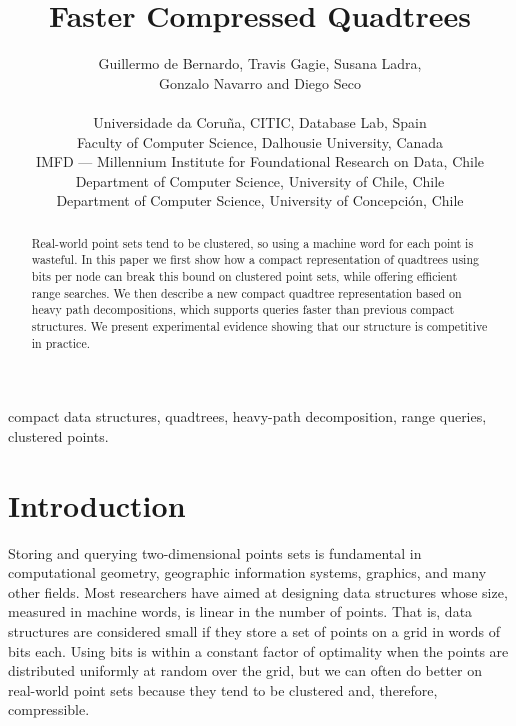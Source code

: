 \documentclass{elsarticle}
\begin{document}
\begin{frontmatter}



\title{Faster Compressed Quadtrees}

\author{Guillermo de Bernardo, Travis Gagie, 
Susana Ladra,\\ Gonzalo Navarro and Diego Seco\\
\ \\
  Universidade da Coruña, CITIC, Database Lab, Spain\\
  Faculty of Computer Science, Dalhousie University, Canada\\
  IMFD --- Millennium Institute for Foundational Research on Data, Chile\\
  Department of Computer Science, University of Chile, Chile\\
  Department of Computer Science, University of Concepci\'on, Chile}
\date{}



\begin{abstract}
Real-world point sets tend to be clustered, so using a machine word for each point is wasteful. In this paper we first show how a compact representation of quadtrees using  bits per node can break this bound on clustered point sets, while offering efficient range searches. We then describe a new compact quadtree representation based on heavy path decompositions, which supports queries faster than previous compact structures. We present experimental evidence showing that our structure is competitive in practice.
\end{abstract}

\begin{keyword}
compact data structures, quadtrees, heavy-path decomposition, range queries, clustered points.
\end{keyword}

\end{frontmatter}

\section{Introduction}
\label{sec:introduction}

Storing and querying two-dimensional points sets is fundamental in computational geometry, geographic information systems, graphics, and many other fields.  Most researchers have aimed at designing data structures whose size, measured in machine words, is linear in the number of points.  That is, data structures are considered small if they store a set of  points on a  grid in  words of  bits each.  Using  bits is within a constant factor of optimality when the points are distributed uniformly at random over the grid, but we can often do better on real-world point sets because they tend to be clustered and, therefore, compressible.
\end{document}
